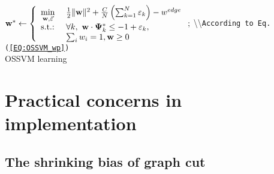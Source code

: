 \documentclass[10pt,journal,compsoc]{newIEEEtran}
\begin{document}
\begin{algorithm}
	$
	\mathbf{w}^*\leftarrow\left\{\begin{array}{ll}
	\min\limits_{\mathbf{w},\vec{\varepsilon}}~& {1\over2}\|\mathbf{w}\|^2 + {C\over N}\left(\sum_{k=1}^N \varepsilon_k\right) - w^{edge} \\
	\hbox{s.t.:}~&  \forall k,~ \mathbf{w}\cdot\mathbf{\Psi}^*_k\leq -1+\varepsilon_k, \\            
	&  \sum_i w_i=1, \mathbf{w}\geq 0 \\
	\end{array}\right.;
	$
	\textbackslash{}\textbackslash{}\texttt{According to Eq. (\ref{EQ:OSSVM_wp})}\\
	\caption{OSSVM learning}\label{ALG:OSSVM}
\end{algorithm}\section{Practical concerns in implementation}\label{sec:practical}\subsection{The shrinking bias of graph cut}
\end{document}
